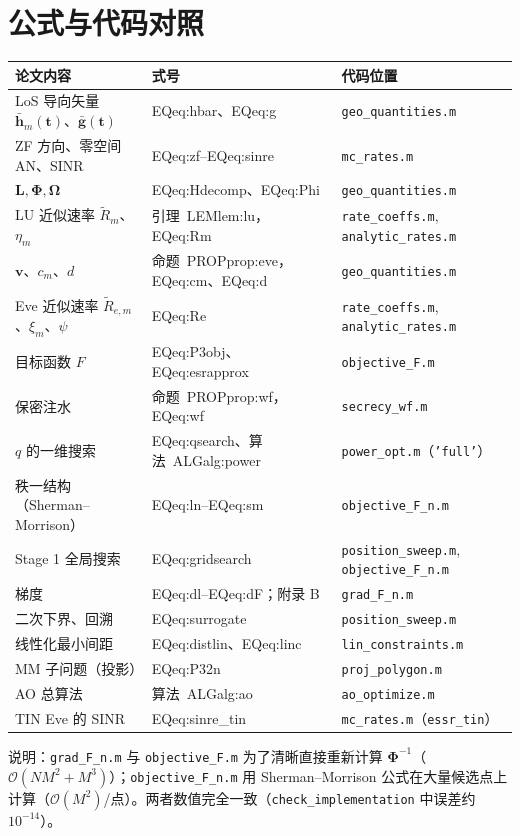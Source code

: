 \documentclass[11pt,a4paper]{ctexart}
\newcommand{\code}[1]{\texttt{#1}}
\newcommand{\bt}{\mathbf t}
\begin{document}
\section{公式与代码对照}
\begin{longtable}{p{5.6cm}p{3.6cm}p{6.2cm}}
\toprule
论文内容 & 式号 & 代码位置 \\ \midrule
LoS 导向矢量 $\bar{\mathbf h}_m(\bt)$、$\bar{\mathbf g}(\bt)$ & EQ{eq:hbar}、EQ{eq:g} & \code{geo\_quantities.m} \\
ZF 方向、零空间 AN、SINR & EQ{eq:zf}--EQ{eq:sinre} & \code{mc\_rates.m} \\
$\mathbf L,\boldsymbol\Phi,\boldsymbol\Omega$ & EQ{eq:Hdecomp}、EQ{eq:Phi} & \code{geo\_quantities.m} \\
LU 近似速率 $\tilde R_m$、$\eta_m$ & 引理~LEM{lem:lu}，EQ{eq:Rm} & \code{rate\_coeffs.m}, \code{analytic\_rates.m} \\
$\mathbf v$、$c_m$、$d$ & 命题~PROP{prop:eve}，EQ{eq:cm}、EQ{eq:d} & \code{geo\_quantities.m} \\
Eve 近似速率 $\tilde R_{e,m}$、$\xi_m$、$\psi$ & EQ{eq:Re} & \code{rate\_coeffs.m}, \code{analytic\_rates.m} \\
目标函数 $F$ & EQ{eq:P3obj}、EQ{eq:esrapprox} & \code{objective\_F.m} \\
保密注水 & 命题~PROP{prop:wf}，EQ{eq:wf} & \code{secrecy\_wf.m} \\
$q$ 的一维搜索 & EQ{eq:qsearch}、算法~ALG{alg:power} & \code{power\_opt.m}（\code{'full'}）\\
秩一结构（Sherman--Morrison）& EQ{eq:ln}--EQ{eq:sm} & \code{objective\_F\_n.m} \\
Stage 1 全局搜索 & EQ{eq:gridsearch} & \code{position\_sweep.m}, \code{objective\_F\_n.m} \\
梯度 & EQ{eq:dl}--EQ{eq:dF}；附录 B & \code{grad\_F\_n.m} \\
二次下界、回溯 & EQ{eq:surrogate} & \code{position\_sweep.m} \\
线性化最小间距 & EQ{eq:distlin}、EQ{eq:linc} & \code{lin\_constraints.m} \\
MM 子问题（投影） & EQ{eq:P32n} & \code{proj\_polygon.m} \\
AO 总算法 & 算法~ALG{alg:ao} & \code{ao\_optimize.m} \\
TIN Eve 的 SINR & EQ{eq:sinre_tin} & \code{mc\_rates.m}（\code{essr\_tin}）\\
\bottomrule
\end{longtable}
\noindent 说明：\code{grad\_F\_n.m} 与 \code{objective\_F.m} 为了清晰直接重新计算 $\boldsymbol\Phi^{-1}$（$\mathcal O(NM^2+M^3)$）；\code{objective\_F\_n.m} 用 Sherman--Morrison 公式在大量候选点上计算（$\mathcal O(M^2)$/点）。两者数值完全一致（\code{check\_implementation} 中误差约 $10^{-14}$）。
\end{document}
